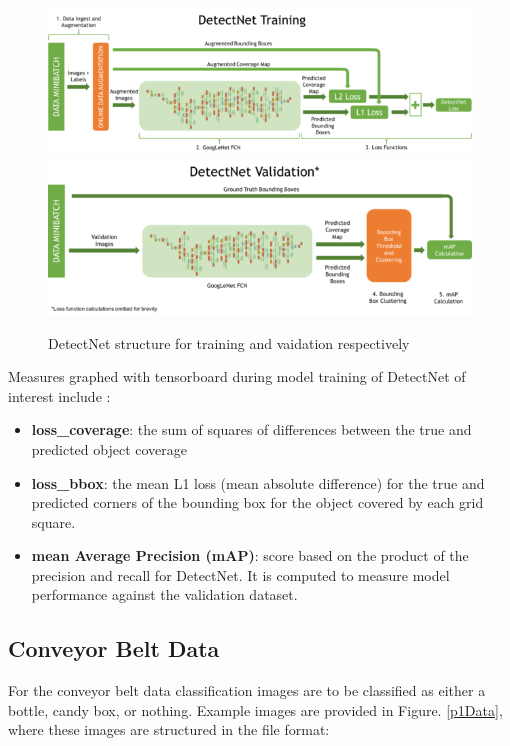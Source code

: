 \documentclass[10pt,journal,compsoc]{IEEEtran}
\begin{document}
\begin{figure}[thpb]
  \centering
  \includegraphics[width=\linewidth]{../img/detectnet_training.png} \\
  \includegraphics[width=\linewidth]{../img/detectnet_validation.png}
  \caption{DetectNet structure for training and vaidation respectively \cite{NvidiaDN}}
  \label{detectNetStruct}
\end{figure}

Measures graphed with tensorboard during model training of DetectNet of interest include \cite{NvidiaDN}:
\begin{itemize}
  \item \textbf{loss\_coverage}: the sum of squares of differences between the true and predicted object coverage
  \item \textbf{loss\_bbox}: the mean L1 loss (mean absolute difference) for the true and predicted corners of the bounding box for the object covered by each grid square.
  \item \textbf{mean Average Precision (mAP)}: score based on the product of the precision and recall for DetectNet. It is computed to measure model performance against the validation dataset.
\end{itemize}


\subsection{Conveyor Belt Data}

For the conveyor belt data classification images are to be classified as either a bottle, candy box, or nothing. Example images are provided in Figure. \ref{p1Data}, where these images are structured in the file format:
\end{document}
